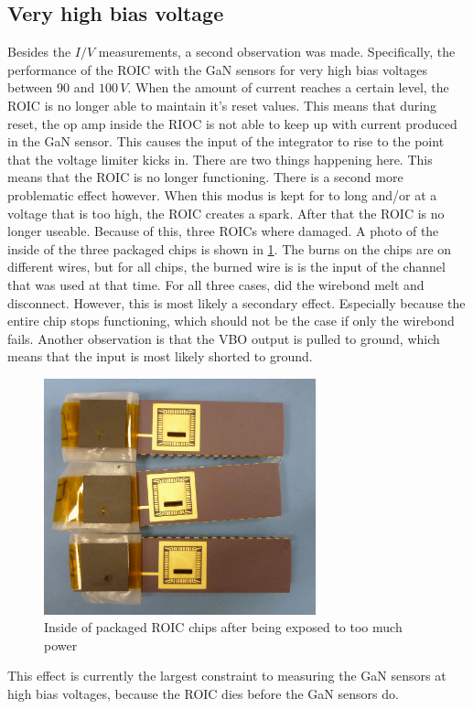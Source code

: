 \subsection{Very high bias voltage}\label{ssec:very_high_bias_voltage}
Besides the $I/V$ measurements, a second observation was made. Specifically, the performance of the ROIC with the GaN sensors for very high bias voltages between 90 and $100\,V$. When the amount of current reaches a certain level, the ROIC is no longer able to maintain it's reset values. This means that during reset, the op amp inside the RIOC is not able to keep up with current produced in the GaN sensor. This causes the input of the integrator to rise to the point that the voltage limiter kicks in. There are two things happening here. This means that the ROIC is no longer functioning. There is a second more problematic effect however. When this modus is kept for to long and/or at a voltage that is too high, the ROIC creates a spark. After that the ROIC is no longer useable. Because of this, three ROICs where damaged. A photo of the inside of the three packaged chips is shown in \cref{fig:burned_chips}. The burns on the chips are on different wires, but for all chips, the burned wire is is the input of the channel that was used at that time. For all three cases, did the wirebond melt and disconnect. However, this is most likely a secondary effect. Especially because the entire chip stops functioning, which should not be the case if only the wirebond fails. Another observation is that the VBO output is pulled to ground, which means that the input is most likely shorted to ground. 


\begin{figure}[H]
	    \centering
	    \includegraphics[width=0.7\textwidth]{fig/burned_chips.JPG}
	    \caption[]%
	    {Inside of packaged ROIC chips after being exposed to too much power}    
	    \label{fig:burned_chips}	
\end{figure}  

This effect is currently the largest constraint to measuring the GaN sensors at high bias voltages, because the ROIC dies before the GaN sensors do.

